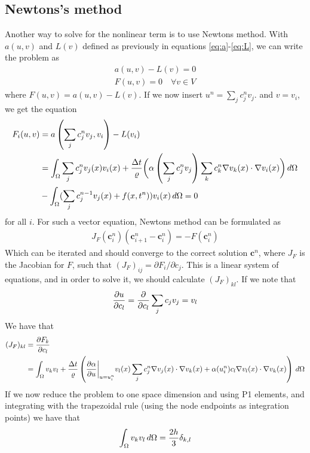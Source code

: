 \documentclass[12pt]{article}
\begin{document}
\subsection{Newtons's method}
Another way to solve for the nonlinear term is to use Newtons method. With $a(u,v)$ and $L(v)$ defined as previously in equations \eqref{eq:a}-\eqref{eq:L}, we can write the problem as 
\begin{align}
 a(u,v) - L(v) = 0 \\
 F(u,v) = 0 \quad \forall v \in V
\end{align}
where $F(u,v) = a(u,v)- L(v)$. If we now insert $u^n = \sum_j c_j^n v_j$. and $v = v_i$, we get the equation
\begin{align}
 F_i(u,v) & = a\left(\sum_j c_j^n v_j, v_i\right) - L(v_i) \\
 & = \int_\Omega  \sum_j c_j^n v_j (x)v_i(x) + {\Delta t \over \varrho}\bigg( \alpha\left(\sum_j c^{n}_j v_j\right)   \sum_k c_k^n \nabla v_k(x)\cdot \nabla v_i(x) \bigg)\, d\Omega  \\
  &-\int_\Omega (\sum_j c_j^{n-1} v_j(x) + f(x,t^n)) v_i(x) \, d\Omega = 0
\end{align}
for all $i$. For such a vector equation, Newtons method can be formulated as 
\begin{align}
 J_F(\textbf{c}_i^n)(\textbf{c}_{i+1}^n - \textbf{c}_{i}^n) = -F(\textbf{c}_i^n)
\end{align}
Which can be iterated and should converge to the correct solution $\textbf{c}^n$, where $J_F$ is the Jacobian for $F$, such that $(J_F)_{ij} = \partial F_i / \partial c_j$. This is a linear system of equations, and in order to solve it, we should calculate $(J_F)_{kl}$. If we note that 
\begin{equation}
{ \partial u \over \partial c_l} = {\partial \over \partial c_l} \sum_j c_j v_j = v_l
\end{equation}
We have that 
\begin{align}
 (J_F)_{kl} & = { \partial F_k \over \partial c_l } \\
 & = \int_\Omega v_k v_l + {\Delta t \over \varrho} \left( {\partial \alpha \over \partial u} \bigg|_{u = u^{n}_i} v_l(x)\sum_j c_j^n \nabla v_j(x)\cdot \nabla v_k(x)  + \alpha(u_i^n) c_l \nabla v_l(x) \cdot \nabla v_k(x) \right) \, d\Omega
\end{align}
If we now reduce the problem to one space dimension and using P1 elements, and integrating with the trapezoidal rule (using the node endpoints as integration points) we have that 
\begin{align}
 \int_\Omega v_k v_l \, d\Omega = {2h \over 3}\delta_{k,l}%
\end{align}
\end{document}
